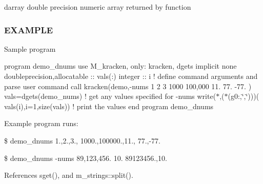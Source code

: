 darray double precision numeric array returned by function \subsubsection*{E\+X\+A\+M\+P\+LE}

Sample program

program demo\+\_\+dnums use M\+\_\+kracken, only\+: kracken, dgets implicit none doubleprecision,allocatable \+:\+: vals(\+:) integer \+:\+: i ! define command arguments and parse user command call kracken(\textquotesingle{}demo\textquotesingle{},\textquotesingle{}-\/nums 1 2 3 1000 100,000 11. 77. -\/77.\textquotesingle{} ) vals=dgets(\textquotesingle{}demo\+\_\+nums\textquotesingle{}) ! get any values specified for -\/nums write($\ast$,\textquotesingle{}($\ast$(g0\+:,\char`\"{},\char`\"{}))\textquotesingle{})( vals(i),i=1,size(vals)) ! print the values end program demo\+\_\+dnums

Example program runs\+:

\$ demo\+\_\+dnums 1.,2.,3., 1000.,100000.,11., 77.,-\/77.

\$ demo\+\_\+dnums -\/nums 89,123,456. 10. 89123456.,10. 

References sget(), and m\+\_\+strings\+::split().

